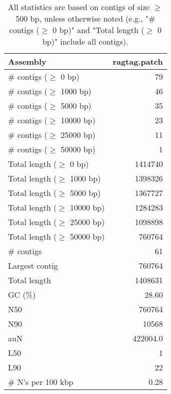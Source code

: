 \documentclass[12pt,a4paper]{article}
\begin{document}
\begin{table}[ht]
\begin{center}
\caption{All statistics are based on contigs of size $\geq$ 500 bp, unless otherwise noted (e.g., "\# contigs ($\geq$ 0 bp)" and "Total length ($\geq$ 0 bp)" include all contigs).}
\begin{tabular}{|l*{1}{|r}|}
\hline
Assembly & ragtag.patch \\ \hline
\# contigs ($\geq$ 0 bp) & 79 \\ \hline
\# contigs ($\geq$ 1000 bp) & 46 \\ \hline
\# contigs ($\geq$ 5000 bp) & 35 \\ \hline
\# contigs ($\geq$ 10000 bp) & 23 \\ \hline
\# contigs ($\geq$ 25000 bp) & 11 \\ \hline
\# contigs ($\geq$ 50000 bp) & 1 \\ \hline
Total length ($\geq$ 0 bp) & 1414740 \\ \hline
Total length ($\geq$ 1000 bp) & 1398326 \\ \hline
Total length ($\geq$ 5000 bp) & 1367727 \\ \hline
Total length ($\geq$ 10000 bp) & 1284283 \\ \hline
Total length ($\geq$ 25000 bp) & 1098898 \\ \hline
Total length ($\geq$ 50000 bp) & 760764 \\ \hline
\# contigs & 61 \\ \hline
Largest contig & 760764 \\ \hline
Total length & 1408631 \\ \hline
GC (\%) & 28.60 \\ \hline
N50 & 760764 \\ \hline
N90 & 10568 \\ \hline
auN & 422004.0 \\ \hline
L50 & 1 \\ \hline
L90 & 22 \\ \hline
\# N's per 100 kbp & 0.28 \\ \hline
\end{tabular}
\end{center}
\end{table}
\end{document}
